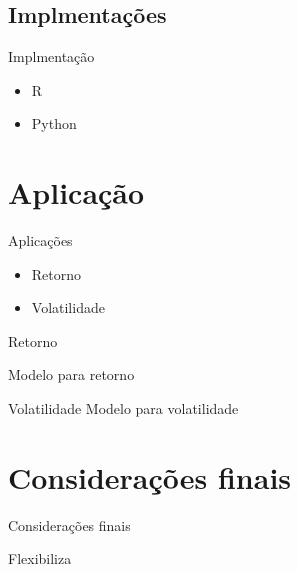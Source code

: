 \documentclass{beamer}
\begin{document}
\subsection{Implmentações}

\begin{frame}{Implmentação}

\begin{itemize}

\item R

\item Python


\end{itemize}

\end{frame}



\section{Aplicação}


\begin{frame}{Aplicações}

\begin{itemize}

\item Retorno

\item Volatilidade
\end{itemize}

\end{frame}


\begin{frame}{Retorno}

Modelo para retorno
\end{frame}


\begin{frame}{Volatilidade}
Modelo para volatilidade
\end{frame}

\section{Considerações finais}
\begin{frame}{Considerações finais}

Flexibiliza

\end{frame}



\begin{frame}[allowframebreaks]%
    {\tiny
    
    
    }
\end{frame}
\end{document}

